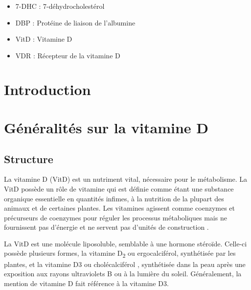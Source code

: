 \documentclass[
  letterpaper,
  DIV=11,
  numbers=noendperiod]{scrartcl}
\providecommand{\tightlist}{%
  \setlength{\itemsep}{0pt}\setlength{\parskip}{0pt}}\usepackage{longtable,booktabs,array}
\begin{document}
\begin{itemize}
\tightlist
\item
  7-DHC : 7-déhydrocholestérol
\item
  DBP : Protéine de liaison de l'albumine
\item
  VitD : Vitamine D
\item
  VDR : Récepteur de la vitamine D
\end{itemize}

\newpage{}

\hypertarget{introduction}{%
\section{Introduction}\label{introduction}}


\newpage{}

\hypertarget{guxe9nuxe9ralituxe9s-sur-la-vitamine-d}{%
\section{Généralités sur la vitamine
D}\label{guxe9nuxe9ralituxe9s-sur-la-vitamine-d}}

\hypertarget{structure}{%
\subsection{Structure}\label{structure}}

La vitamine D (VitD) est un nutriment vital, nécessaire pour le
métabolisme. La VitD possède un rôle de vitamine qui est définie comme
étant une substance organique essentielle en quantités infimes, à la
nutrition de la plupart des animaux et de certaines plantes. Les
vitamines agissent comme coenzymes et précurseurs de coenzymes pour
réguler les processus métaboliques mais ne fournissent pas d'énergie et
ne servent pas d'unités de construction \autocite{Ellison.2020}.

La VitD est une molécule liposoluble, semblable à une hormone stéroïde.
Celle-ci possède plusieurs formes, la vitamine D\textsubscript{2} ou
ergocalciférol, synthétisée par les plantes, et la vitamine D3 ou
cholécalciférol , synthétisée dans la peau après une exposition aux
rayons ultraviolets B ou à la lumière du soleil. Généralement, la
mention de vitamine D fait référence à la vitamine D3.
\end{document}
